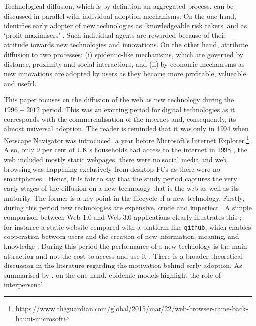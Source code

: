 \documentclass[
  authoryear,
  preprint,
  3p]{elsarticle}
\begin{document}
Technological diffusion, which is by definition an aggregated process,
can be discussed in parallel with individual adoption mechanisms. On the
one hand, \citet{rogers2010diffusion} identifies early adopter of new
technologies as `knowledgeable risk takers' and \citet{griliches1957} as
`profit maximisers' \citep{ding2010modeling}. Such individual agents are
rewarded because of their attitude towards new technologies and
innovations. On the other hand, \citet{perkins2011internet} attribute
diffusion to two processes: (i) epidemic-like mechanisms, which are
governed by distance, proximity and social interactions, and (ii) by
economic mechanisms as new innovations are adopted by users as they
become more profitable, valueable and useful.

This paper focuses on the diffusion of the web as new technology during
the \(1996-2012\) period. This was an exciting period for digital
technologies as it corresponds with the commercialisation of the
internet and, consequently, its almost universal adoption. The reader is
reminded that it was only in 1994 when Netscape Navigator was
introduced, a year before Microsoft's Internet Explorer.\footnote{\url{https://www.theguardian.com/global/2015/mar/22/web-browser-came-back-haunt-microsoft}}
Also, only \(9\) per cent of UK's households had access to the internet
in \(1998\) \citep{ons2018}, the web included mostly static webpages,
there were no social media and web browsing was happening exclusively
from desktop PCs as there were no smartphones \citep{tranosuk}. Hence,
it is fair to say that the study period captures the very early stages
of the diffusion on a new technology that is the web as well as its
maturity. The former is a key point in the lifecycle of a new
technology. Firstly, during this period new technologies are expensive,
crude and imperfect \citep{rosenberg1994exploring, wilson201281}. A
simple comparison between Web 1.0 and Web 3.0 applications clearly
illustrates this \citep{tranos2020social}; for instance a static website
compared with a platform like \texttt{github}, which enables cooperation
between users and the creation of new information, meaning, and
knowledge \citep{faraj2016special, barassi2012does}. During this period
the performance of a new technology is the main attraction and not the
cost to access and use it \citep{wilson2011lessons}. There is a broader
theoretical discussion in the literature regarding the motivation behind
early adoption. As summarised by \citet{perkins2005international}, on
the one hand, epidemic models highlight the role of interpersonal
\end{document}
